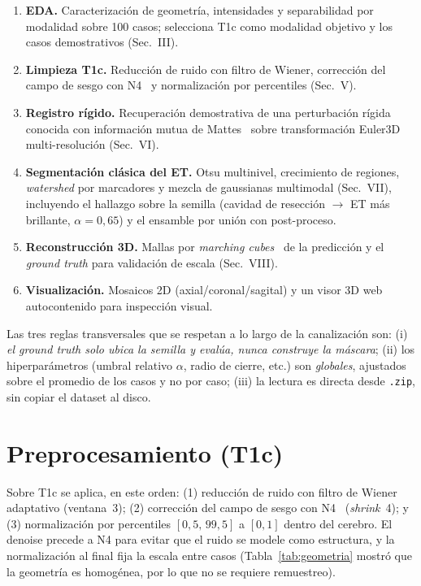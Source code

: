 \documentclass[conference]{IEEEtran}
\begin{document}
\begin{enumerate}
  \item \textbf{EDA.} Caracterización de geometría, intensidades y
        separabilidad por modalidad sobre 100 casos; selecciona
        T1c como modalidad objetivo y los casos demostrativos
        (Sec.~III).
  \item \textbf{Limpieza T1c.} Reducción de ruido con filtro de
        Wiener, corrección del campo de sesgo con
        N4~\cite{tustison2010n4} y normalización por percentiles
        (Sec.~V).
  \item \textbf{Registro rígido.} Recuperación demostrativa de
        una perturbación rígida conocida con información mutua de
        Mattes~\cite{mattes2003} sobre transformación Euler3D
        multi-resolución (Sec.~VI).
  \item \textbf{Segmentación clásica del ET.} Otsu multinivel,
        crecimiento de regiones, \textit{watershed} por
        marcadores y mezcla de gaussianas multimodal
        (Sec.~VII), incluyendo el hallazgo sobre la semilla
        (cavidad de resección $\to$ ET más brillante,
        $\alpha=0{,}65$) y el ensamble por unión con post-proceso.
  \item \textbf{Reconstrucción 3D.} Mallas por \textit{marching
        cubes}~\cite{lorensen1987marching} de la predicción y el
        \textit{ground truth} para validación de escala
        (Sec.~VIII).
  \item \textbf{Visualización.} Mosaicos 2D (axial/coronal/sagital)
        y un visor 3D web autocontenido para inspección visual.
\end{enumerate}

Las tres reglas transversales que se respetan a lo largo de la
canalización son: (i) \emph{el \textit{ground truth} solo ubica la
semilla y evalúa, nunca construye la máscara}; (ii) los
hiperparámetros (umbral relativo $\alpha$, radio de cierre, etc.)
son \emph{globales}, ajustados sobre el promedio de los casos y no
por caso; (iii) la lectura es directa desde \texttt{.zip}, sin
copiar el dataset al disco.

\section{Preprocesamiento (T1c)}
Sobre T1c se aplica, en este orden: (1) reducción de ruido con
filtro de Wiener adaptativo (ventana~3); (2) corrección del campo
de sesgo con N4~\cite{tustison2010n4} (\textit{shrink}~4); y
(3) normalización por percentiles $[0{,}5,\,99{,}5]$ a $[0,1]$
dentro del cerebro. El denoise precede a N4 para evitar que el
ruido se modele como estructura, y la normalización al final fija
la escala entre casos (Tabla~\ref{tab:geometria} mostró que la
geometría es homogénea, por lo que no se requiere remuestreo).
\end{document}

